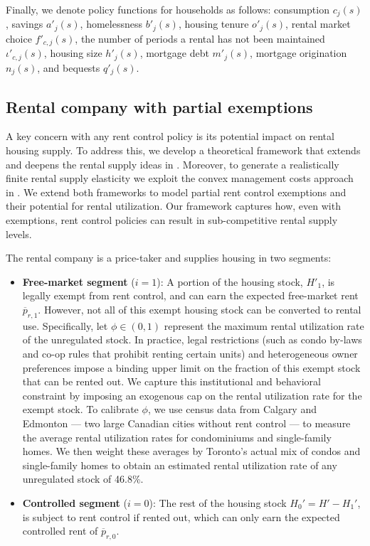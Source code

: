 \documentclass[parskip=full]{article}
\begin{document}
Finally, we denote policy functions for households as follows: consumption $c_{j}(s)$, savings $a'_{j}(s)$, homelessness $b'_{j}(s)$, housing tenure $o'_{j}(s)$, rental market choice $f'_{c,j}(s)$, the number of periods a rental has not been maintained $\iota'_{c,j}(s)$, housing size $h'_{j}(s)$, mortgage debt $m'_{j}(s)$, mortgage origination $n_{j}(s)$, and bequests $q'_{j}(s)$.

\subsection{Rental company with partial exemptions}\label{sec:rental_company}

A key concern with any rent control policy is its potential impact on rental housing supply. To address this, we develop a theoretical framework that extends and deepens the rental supply ideas in \citet{fallis-1985}. Moreover, to generate a realistically finite rental supply elasticity we exploit the convex management costs approach in \citet{garrigaeetal-2009}. We extend both frameworks to model partial rent control exemptions and their potential for rental utilization. Our framework captures how, even with exemptions, rent control policies can result in sub-competitive rental supply levels.

The rental company is a price-taker and supplies housing in two segments:
\begin{itemize}
    \item \textbf{Free-market segment} ($i=1$): A portion of the housing stock, $H'_1$, is legally exempt from rent control, and can earn the expected free-market rent $\overline{p}_{r,1}$. However, not all of this exempt housing stock can be converted to rental use. Specifically, let $\phi \in (0,1)$ represent the maximum rental utilization rate of the unregulated stock. In practice, legal restrictions (such as condo by-laws and co-op rules that prohibit renting certain units) and heterogeneous owner preferences impose a binding upper limit on the fraction of this exempt stock that can be rented out. We capture this institutional and behavioral constraint by imposing an exogenous cap on the rental utilization rate for the exempt stock. To calibrate $\phi$, we use census data from Calgary and Edmonton — two large Canadian cities without rent control — to measure the average rental utilization rates for condominiums and single-family homes. We then weight these averages by Toronto’s actual mix of condos and single-family homes to obtain an estimated rental utilization rate of any unregulated stock of 46.8\%.
    \item \textbf{Controlled segment} ($i=0$): The rest of the housing stock $H_0'=H'-H_1'$, is subject to rent control if rented out, which can only earn the expected controlled rent of $\overline{p}_{r,0}$.
\end{itemize}
\end{document}

